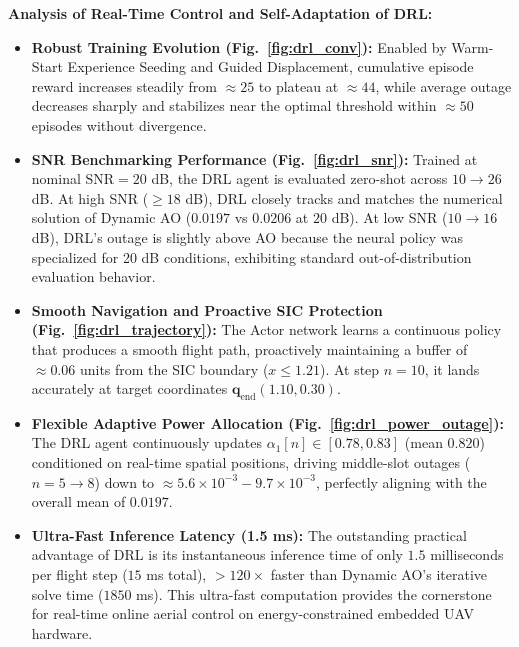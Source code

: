 \noindent \textbf{Analysis of Real-Time Control and Self-Adaptation of DRL:}
\begin{itemize}
    \item \textbf{Robust Training Evolution (Fig.~\ref{fig:drl_conv}):} Enabled by Warm-Start Experience Seeding and Guided Displacement, cumulative episode reward increases steadily from $\approx 25$ to plateau at $\approx 44$, while average outage decreases sharply and stabilizes near the optimal threshold within $\approx 50$ episodes without divergence.
    \item \textbf{SNR Benchmarking Performance (Fig.~\ref{fig:drl_snr}):} Trained at nominal $\text{SNR} = 20$ dB, the DRL agent is evaluated zero-shot across $10 \to 26$ dB. At high SNR ($\ge 18$ dB), DRL closely tracks and matches the numerical solution of Dynamic AO ($0.0197$ vs $0.0206$ at $20$ dB). At low SNR ($10 \to 16$ dB), DRL's outage is slightly above AO because the neural policy was specialized for 20 dB conditions, exhibiting standard out-of-distribution evaluation behavior.
    \item \textbf{Smooth Navigation and Proactive SIC Protection (Fig.~\ref{fig:drl_trajectory}):} The Actor network learns a continuous policy that produces a smooth flight path, proactively maintaining a buffer of $\approx 0.06$ units from the SIC boundary ($x \le 1.21$). At step $n = 10$, it lands accurately at target coordinates $\mathbf{q}_{\text{end}}(1.10, 0.30)$.
    \item \textbf{Flexible Adaptive Power Allocation (Fig.~\ref{fig:drl_power_outage}):} The DRL agent continuously updates $\alpha_1[n] \in [0.78, 0.83]$ (mean $0.820$) conditioned on real-time spatial positions, driving middle-slot outages ($n = 5 \to 8$) down to $\approx 5.6 \times 10^{-3} - 9.7 \times 10^{-3}$, perfectly aligning with the overall mean of $0.0197$.
    \item \textbf{Ultra-Fast Inference Latency (1.5 ms):} The outstanding practical advantage of DRL is its instantaneous inference time of only $1.5$ milliseconds per flight step ($15$ ms total), $> 120\times$ faster than Dynamic AO's iterative solve time ($1850$ ms). This ultra-fast computation provides the cornerstone for real-time online aerial control on energy-constrained embedded UAV hardware.
\end{itemize}
